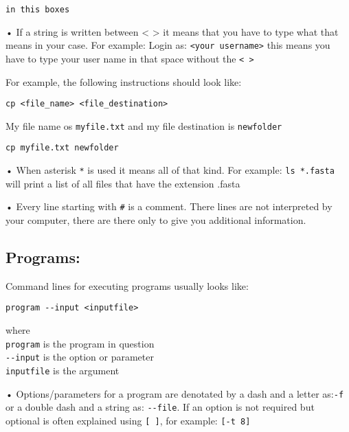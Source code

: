 \documentclass[
]{book}
\begin{document}
\begin{verbatim}
in this boxes
\end{verbatim}

• If a string is written between \textless{} \textgreater{} it means that you have to type what that means in your case. For example: Login as: \texttt{\textless{}your\ username\textgreater{}} this means you have to type your user name in that space without the \texttt{\textless{}\ \textgreater{}}

For example, the following instructions should look like:

\begin{verbatim}
cp <file_name> <file_destination>
\end{verbatim}

My file name os \texttt{myfile.txt} and my file destination is \texttt{newfolder}

\begin{verbatim}
cp myfile.txt newfolder
\end{verbatim}

• When asterisk \texttt{*} is used it means all of that kind. For example: \texttt{ls\ *.fasta} will print a list of all files that have the extension .fasta

• Every line starting with \texttt{\#} is a comment. There lines are not interpreted by your computer, there are there only to give you additional information.

\hypertarget{programs}{%
\subsection{Programs:}\label{programs}}

Command lines for executing programs usually looks like:

\begin{verbatim}
program --input <inputfile>
\end{verbatim}

where\\
\texttt{program} is the program in question\\
\texttt{-\/-input} is the option or parameter\\
\texttt{inputfile} is the argument

• Options/parameters for a program are denotated by a dash and a letter as:\texttt{-f} or a double dash and a string as: \texttt{-\/-file}. If an option is not required but optional is often explained using \texttt{{[}\ {]}}, for example: \texttt{{[}-t\ 8{]}}
\end{document}
